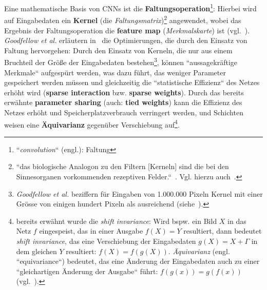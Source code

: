Eine mathematische Basis von CNNs ist die \textbf{Faltungsoperation}\footnote{
    ``\textit{convolution}`` (engl.): Faltung
}: Hierbei wird auf Eingabedaten ein \textbf{Kernel} (die \textit{Faltungsmatrix})\footnote{
    ``das biologische Analogon zu den Filtern [Kerneln] sind die bei den Sinnesorganen vorkommenden rezeptiven Felder.``~\cite[326]{Ert21b}. Vgl. hierzu auch~\cite[439]{LBH15}.
} angewendet, wobei das Ergebnis der Faltungsoperation die \textbf{feature map} (\textit{Merkmalskarte}) ist (vgl.~\cite[370]{GBC18}). \textit{Goodfellow et al.} erläutern in~\cite[374 ff.]{GBC18} die Optimierungen, die durch den Einsatz von Faltung hervorgehen: Durch den Einsatz von Kerneln, die nur aus einem Bruchteil der Größe der Eingabedaten bestehen\footnote{\textit{Goodfellow et al.} beziffern für Eingaben von 1.000.000 Pixeln Kernel mit einer Grösse von einigen hundert Pixeln als ausreichend (siehe~\cite[374]{GBC18}).
}, können ``aussagekräftige Merkmale`` aufgespürt werden, was dazu führt, das weniger Parameter gespeichert werden müssen und gleichzeitig die ``statistische Effizienz`` des Netzes erhöht wird (\textbf{sparse interaction} bzw. \textbf{sparse weights}). Durch das bereits erwähnte \textbf{parameter sharing} (auch: \textbf{tied weights}) kann die Effizienz des Netzes erhöht und Speicherplatzverbrauch verringert werden, und Schichten weisen eine \textbf{Äquivarianz} gegenüber Verschiebung auf\footnote{ bereits erwähnt wurde die \textit{shift invariance}: Wird bspw. ein Bild $X$ in das Netz $f$ eingespeist, das in einer Ausgabe $f(X) = Y$ resultiert, dann bedeutet \textit{shift invariance}, das eine Verschiebung der Eingabedaten $g(X) = X+\Gamma$ in dem gleichen $Y$ resultiert: $f(X) = f(g(X))$.  \textit{Äquivarianz} (engl. ``equivariance``) bedeutet, das eine Änderung der Eingabedaten auch zu einer ``gleichartigen Änderung der Ausgabe`` führt: $f(g(x)) = g(f(x))$ (vgl.~\cite[377]{GBC18}).
}.



